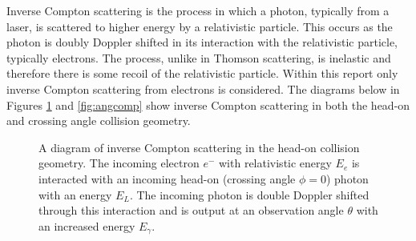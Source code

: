 \documentclass[11pt]{article}
\begin{document}
Inverse Compton scattering is the process in which a photon, typically from a laser, is scattered to higher energy by a relativistic particle. This occurs as the photon is doubly Doppler shifted in its interaction with the relativistic particle, typically electrons. The process, unlike in Thomson scattering, is inelastic and therefore there is some recoil of the relativistic particle. Within this report only inverse Compton scattering from electrons is considered. The diagrams below in Figures \ref{fig:headoncomp} and \ref{fig:angcomp} show inverse Compton scattering in both the head-on and crossing angle collision geometry.

\begin{figure}[H]
\centering
{}
\caption{\label{fig:headoncomp} A diagram of inverse Compton scattering in the head-on collision geometry. The incoming electron $e^{-}$ with relativistic energy $E_{e}$ is interacted with an incoming head-on (crossing angle $\phi=0$) photon with an energy $E_{L}$. The incoming photon is double Doppler shifted through this interaction and is output at an observation angle $\theta$ with an increased energy $E_{\gamma}$.}
\end{figure}
\end{document}
